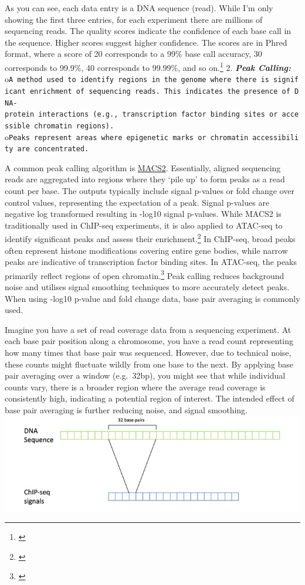 \documentclass[
]{book}
\begin{document}
As you can see, each data entry is a DNA sequence (read). While I'm only showing the first three entries, for each experiment there are millions of sequencing reads. The quality scores indicate the confidence of each base call in the sequence. Higher scores suggest higher confidence. The scores are in Phred format, where a score of 20 corresponds to a 99\% base call accuracy, 30 corresponds to 99.9\%, 40 corresponds to 99.99\%, and so on.\footnote{\citet{green}}
2. \textbf{\emph{Peak Calling:}}
o\texttt{A\ method\ used\ to\ identify\ regions\ in\ the\ genome\ where\ there\ is\ significant\ enrichment\ of\ sequencing\ reads.\ This\ indicates\ the\ presence\ of\ DNA-protein\ interactions\ (e.g.,\ transcription\ factor\ binding\ sites\ or\ accessible\ chromatin\ regions).}
o\texttt{Peaks\ represent\ areas\ where\ epigenetic\ marks\ or\ chromatin\ accessibility\ are\ concentrated.}

A common peak calling algorithm is \href{https://hbctraining.github.io/Intro-to-ChIPseq/lessons/05_peak_calling_macs.html}{MACS2}. Essentially, aligned sequencing reads are aggregated into regions where they `pile up' to form peaks as a read count per base. The outputs typically include signal p-values or fold change over control values, representing the expectation of a peak. Signal p-values are negative log transformed resulting in -log10 signal p-values. While MACS2 is traditionally used in ChIP-seq experiments, it is also applied to ATAC-seq to identify significant peaks and assess their enrichment.\footnote{\citet{mistry2022}} In ChIP-seq, broad peaks often represent histone modifications covering entire gene bodies, while narrow peaks are indicative of transcription factor binding sites. In ATAC-seq, the peaks primarily reflect regions of open chromatin.\footnote{\citet{wilbanks2010}} Peak calling reduces background noise and utilises signal smoothing techniques to more accurately detect peaks. When using -log10 p-value and fold change data, base pair averaging is commonly used.

Imagine you have a set of read coverage data from a sequencing experiment. At each base pair position along a chromosome, you have a read count representing how many times that base pair was sequenced. However, due to technical noise, these counts might fluctuate wildly from one base to the next. By applying base pair averaging over a window (e.g.~32bp), you might see that while individual counts vary, there is a broader region where the average read coverage is consistently high, indicating a potential region of interest. The intended effect of base pair averaging is further reducing noise, and signal smoothing.
\includegraphics{images/bp_resolution.png}
\end{document}

